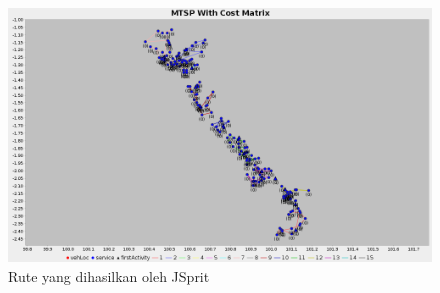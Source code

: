 \begin{figure}[!]
	\centering
	\includegraphics[width=\textwidth]{Resources/Images/analysis_mtsp_no_time_windows}
	\captionsetup{format=hang}
	\caption{Rute yang dihasilkan oleh JSprit}
	\label{fig:analysis_mtsp_recommendation}
\end{figure}


